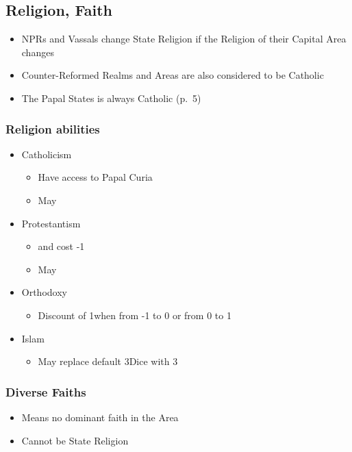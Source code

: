 \documentclass[10pt]{article}
\begin{document}
\subsection*{Religion, Faith }
\begin{itemize}
	\item NPRs and Vassals change State Religion if the Religion of their Capital Area changes
	\item Counter-Reformed Realms and Areas are also considered to be Catholic
	\item The \guilsinglright Papal States is always Catholic (p.~5)
\end{itemize}

\subsubsection*{Religion abilities}
\begin{itemize}
	\item Catholicism
	\begin{itemize}
		\item Have access to Papal Curia
		\item May 
	\end{itemize}
	\item Protestantism
	\begin{itemize}
		\item {} and  cost -1\adminpower
		\item May 
	\end{itemize}
	\item{Orthodoxy}
	\begin{itemize}
		\item Discount of 1\adminpower when  from -1 to 0 or from 0 to 1
	\end{itemize}
	\item{Islam}
	\begin{itemize}
		\item May replace default 3\infantry Dice with 3\cavalry
	\end{itemize}
\end{itemize}

\subsubsection*{Diverse Faiths}
\begin{itemize}
	\item Means no dominant faith in the Area
	\item Cannot be State Religion
\end{itemize}
\end{document}
